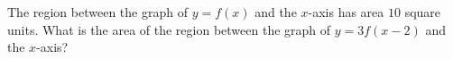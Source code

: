 The region between the graph of $y=f(x)$ and the $x$-axis has area $10$ square units. What is the area of the region between the graph of $y=3f(x-2)$ and the $x$-axis?
